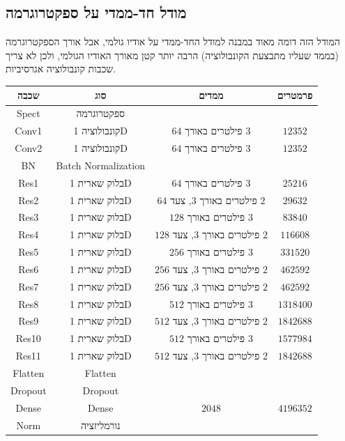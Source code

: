 \documentclass[hebrew, a4paper]{article}
\theoremstyle{plain}
\theoremstyle{definition}
\numberwithin{equation}{section}
\begin{document}
\subsection{מודל חד-ממדי על ספקטרוגרמה}
\label{sec:architecture-spect1d}

המודל הזה דומה מאוד במבנה למודל החד-ממדי על אודיו גולמי, אבל אורך
הספקטרוגרמה (בממד שעליו מתבצעת הקונבולוציה) הרבה יותר קטן מאורך האודיו
הגולמי, ולכן לא צריך שכבות קונבולוציה אגרסיביות.

\begin{center}
  \begin{tabular}{cccc}
    שכבה & סוג & ממדים & פרמטרים \\\hline
    Spect & ספקטרוגרמה & & \\
    Conv1 & קונבולוציה 1D & $64$ פילטרים באורך $3$ & $\num{12352}$ \\
    Conv2 & קונבולוציה 1D & $64$ פילטרים באורך $3$ & $\num{12352}$ \\
    BN & Batch Normalization & & \\
    Res1 & בלוק שארית 1D & $64$ פילטרים באורך $3$ & $\num{25216}$ \\
    Res2 & בלוק שארית 1D & $64$ פילטרים באורך $3$, צעד $2$ & $\num{29632}$ \\
    Res3 & בלוק שארית 1D & $128$ פילטרים באורך $3$ & $\num{83840}$ \\
    Res4 & בלוק שארית 1D & $128$ פילטרים באורך $3$, צעד $2$ & $\num{116608}$ \\
    Res5 & בלוק שארית 1D & $256$ פילטרים באורך $3$ & $\num{331520}$ \\
    Res6 & בלוק שארית 1D & $256$ פילטרים באורך $3$, צעד $2$ & $\num{462592}$ \\
    Res7 & בלוק שארית 1D & $256$ פילטרים באורך $3$, צעד $2$ & $\num{462592}$ \\
    Res8 & בלוק שארית 1D & $512$ פילטרים באורך $3$ & $\num{1318400}$ \\
    Res9 & בלוק שארית 1D & $512$ פילטרים באורך $3$, צעד $2$ & $\num{1842688}$ \\
    Res10 & בלוק שארית 1D & $512$ פילטרים באורך $3$ & $\num{1577984}$ \\
    Res11 & בלוק שארית 1D & $512$ פילטרים באורך $3$, צעד $2$ & $\num{1842688}$ \\
    Flatten & Flatten & & \\
    Dropout & Dropout & & \\
    Dense & Dense & $\num{2048}$ & $\num{4196352}$ \\
    Norm & נורמליזציה & &
  \end{tabular}
\end{center}
\end{document}
